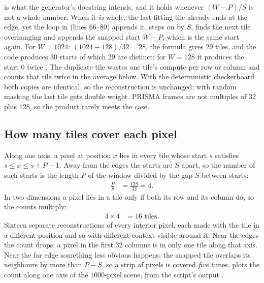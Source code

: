 \begin{sourcenote}
 is what the generator's docstring intends, and it holds whenever $(W-P)/S$ is not
a whole number. When it \emph{is} whole, the last fitting tile already ends at the edge, yet the loop in
 (lines 66--80) appends it, steps on by $S$, finds the next tile overhanging and
appends the snapped start $W-P$, which is the same start again. For $W=1024$: $(1024-128)/32=28$, the formula
gives $29$ tiles, and the code produces 30 starts of which 29 are distinct; for $W=128$ it produces the start
$0$ twice \tagC. The duplicate tile wastes one tile's compute per row or column and counts that tile twice in
the average below. With the deterministic checkerboard both copies are identical, so the reconstruction is
unchanged; with random masking the last tile gets double weight. PRISMA frames are not multiples of 32
plus 128, so the product rarely meets the case.
\end{sourcenote}


\subsection{How many tiles cover each pixel}\label{sec:inference:coverage}

Along one axis, a pixel at position $x$ lies in every tile whose start $s$ satisfies $s\le x\le s+P-1$. Away
from the edges the starts are $S$ apart, so the number of such starts is the length $P$ of the window
divided by the gap $S$ between starts:
\begin{align*}
\frac{P}{S} &= \frac{128}{32} = 4.
\end{align*}
In two dimensions a pixel lies in a tile only if both its row and its column do, so the counts multiply:
\begin{align*}
4\times4 &= 16 \text{ tiles.}
\end{align*}
Sixteen separate reconstructions of every interior pixel, each made with the tile in a different position
and so with different context visible around it. Near the edges the count drops: a pixel in the first 32
columns is in only one tile along that axis. Near the far edge something less obvious happens: the snapped
tile overlaps its neighbours by more than $P-S$, so a strip of pixels is covered \emph{five} times.
 plots the count along one axis of the $1000$-pixel scene, from the script's
output \tagC.

